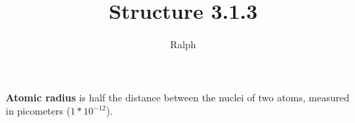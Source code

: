 

\title{Structure 3.1.3}
\author{Ralph}


\maketitle
\textbf{Atomic radius} is half the distance between the nuclei of two atoms, measured in picometers ($1*10^{-12}$).



